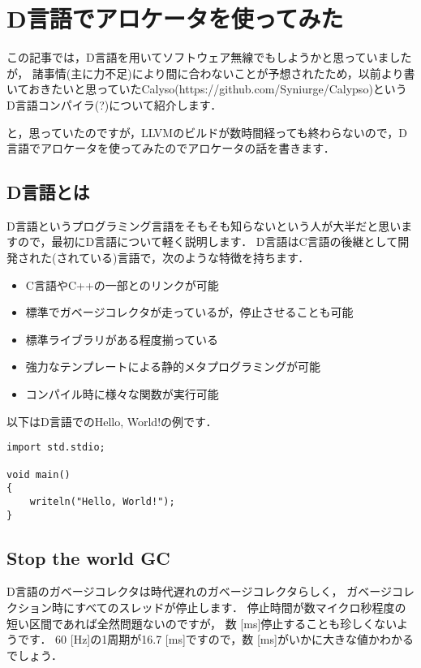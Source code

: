 \chapter{D言語でアロケータを使ってみた}

この記事では，D言語を用いてソフトウェア無線でもしようかと思っていましたが，
諸事情(主に力不足)により間に合わないことが予想されたため，以前より書いておきたいと思っていたCalyso(https://github.com/Syniurge/Calypso)というD言語コンパイラ(?)について紹介します．

と，思っていたのですが，LLVMのビルドが数時間経っても終わらないので，D言語でアロケータを使ってみたのでアロケータの話を書きます．

\section{D言語とは}

D言語というプログラミング言語をそもそも知らないという人が大半だと思いますので，最初にD言語について軽く説明します．
D言語はC言語の後継として開発された(されている)言語で，次のような特徴を持ちます．

\begin{itemize}
\item C言語やC++の一部とのリンクが可能
\item 標準でガベージコレクタが走っているが，停止させることも可能
\item 標準ライブラリがある程度揃っている
\item 強力なテンプレートによる静的メタプログラミングが可能
\item コンパイル時に様々な関数が実行可能
\end{itemize}

以下はD言語でのHello, World!の例です．

\begin{lstlisting}[]
import std.stdio;

void main()
{
    writeln("Hello, World!");
}
\end{lstlisting}


\section{Stop the world GC}

D言語のガベージコレクタは時代遅れのガベージコレクタらしく，
ガベージコレクション時にすべてのスレッドが停止します．
停止時間が数マイクロ秒程度の短い区間であれば全然問題ないのですが，
数 [ms]停止することも珍しくないようです． 60 [Hz]の1周期が16.7
{[}ms{]}ですので，数 [ms]がいかに大きな値かわかるでしょう．

